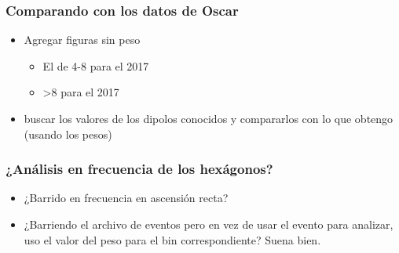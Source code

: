 


\subsubsection{Comparando con los datos de Oscar}

\begin{itemize}
	\item Agregar figuras sin peso 
	\begin{itemize}
		\item El de 4-8 para el 2017
		\item >8 para el 2017
	\end{itemize}
	\item buscar los valores de los dipolos conocidos y compararlos con lo que obtengo (usando los pesos)
\end{itemize}

\subsubsection{¿Análisis en frecuencia de los hexágonos?} \label{analisis_peso}
\begin{itemize}
	\item ¿Barrido en frecuencia en ascensión recta?
	\item ¿Barriendo el archivo de eventos pero en vez de usar el evento para analizar, uso el valor del peso para el bin correspondiente? Suena bien.
\end{itemize}


